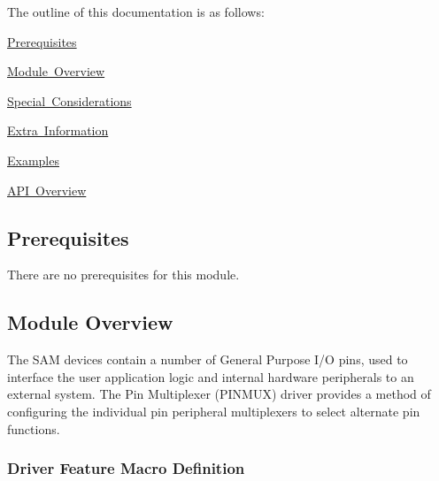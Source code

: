 The outline of this documentation is as follows\+:
\begin{DoxyItemize}
\item \mbox{\hyperlink{group__asfdoc__sam0__system__pinmux__group_asfdoc_sam0_system_pinmux_prerequisites}{Prerequisites}}
\item \mbox{\hyperlink{group__asfdoc__sam0__system__pinmux__group_asfdoc_sam0_system_pinmux_module_overview}{Module Overview}}
\item \mbox{\hyperlink{group__asfdoc__sam0__system__pinmux__group_asfdoc_sam0_system_pinmux_special_considerations}{Special Considerations}}
\item \mbox{\hyperlink{group__asfdoc__sam0__system__pinmux__group_asfdoc_sam0_system_pinmux_extra_info}{Extra Information}}
\item \mbox{\hyperlink{group__asfdoc__sam0__system__pinmux__group_asfdoc_sam0_system_pinmux_examples}{Examples}}
\item \mbox{\hyperlink{group__asfdoc__sam0__system__pinmux__group_asfdoc_sam0_system_pinmux_api_overview}{A\+PI Overview}}
\end{DoxyItemize}\hypertarget{group__asfdoc__sam0__system__pinmux__group_asfdoc_sam0_system_pinmux_prerequisites}{}\subsection{Prerequisites}\label{group__asfdoc__sam0__system__pinmux__group_asfdoc_sam0_system_pinmux_prerequisites}
There are no prerequisites for this module.\hypertarget{group__asfdoc__sam0__system__pinmux__group_asfdoc_sam0_system_pinmux_module_overview}{}\subsection{Module Overview}\label{group__asfdoc__sam0__system__pinmux__group_asfdoc_sam0_system_pinmux_module_overview}
The S\+AM devices contain a number of General Purpose I/O pins, used to interface the user application logic and internal hardware peripherals to an external system. The Pin Multiplexer (P\+I\+N\+M\+UX) driver provides a method of configuring the individual pin peripheral multiplexers to select alternate pin functions.\hypertarget{group__asfdoc__sam0__system__pinmux__group_asfdoc_sam0_system_pinmux_features}{}\subsubsection{Driver Feature Macro Definition}\label{group__asfdoc__sam0__system__pinmux__group_asfdoc_sam0_system_pinmux_features}
